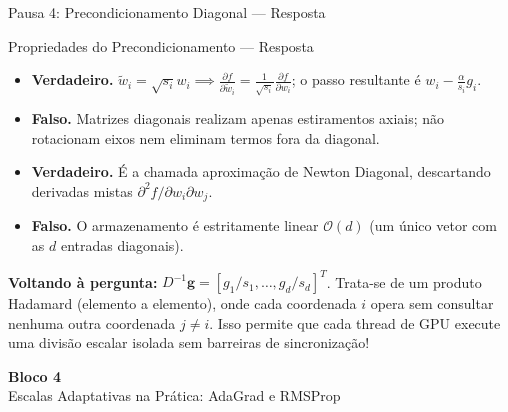 \documentclass[aspectratio=169, 10pt]{beamer}
\newenvironment{callouttip}[1][Dica]{%
  \begin{exampleblock}{#1}%
}{%
  \end{exampleblock}%
}
\newcommand{\cmark}{\textcolor{green!60!black}{\textbf{\ding{51}}}}
\newcommand{\xmark}{\textcolor{red!70!black}{\textbf{\ding{55}}}}
\begin{document}
\begin{frame}{Pausa 4: Precondicionamento Diagonal --- Resposta}
  \begin{callouttip}[Propriedades do Precondicionamento --- Resposta]
    \begin{itemize}
      \item[\cmark] \textbf{Verdadeiro.} $\tilde{w}_i = \sqrt{s_i} w_i \implies \frac{\partial f}{\partial \tilde{w}_i} = \frac{1}{\sqrt{s_i}} \frac{\partial f}{\partial w_i}$; o passo resultante é $w_i - \frac{\alpha}{s_i} g_i$.
      \item[\xmark] \textbf{Falso.} Matrizes diagonais realizam apenas estiramentos axiais; não rotacionam eixos nem eliminam termos fora da diagonal.
      \item[\cmark] \textbf{Verdadeiro.} É a chamada aproximação de Newton Diagonal, descartando derivadas mistas $\partial^2 f / \partial w_i \partial w_j$.
      \item[\xmark] \textbf{Falso.} O armazenamento é estritamente linear $\mathcal{O}(d)$ (um único vetor com as $d$ entradas diagonais).
    \end{itemize}
  \end{callouttip}
  \vspace{0.2cm}
  \textbf{Voltando à pergunta:} $D^{-1}\mathbf{g} = [g_1/s_1, \dots, g_d/s_d]^T$. Trata-se de um produto Hadamard (elemento a elemento), onde cada coordenada $i$ opera sem consultar nenhuma outra coordenada $j \neq i$. Isso permite que cada thread de GPU execute uma divisão escalar isolada sem barreiras de sincronização!
\end{frame}

\begin{frame}[plain]
  \centering
  \vspace{2cm}
  {\Huge \textcolor{unicampblue}{\textbf{Bloco 4}}}\\
  \vspace{0.5cm}
  {\large \textcolor{unicampteal}{Escalas Adaptativas na Prática: AdaGrad e RMSProp}}
\end{frame}
\end{document}
